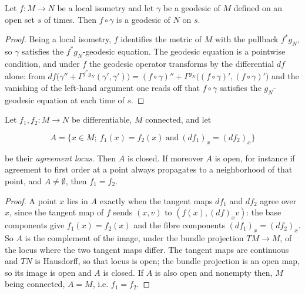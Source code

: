 \begin{lemma}
  \label{lem:dc-ch8-4-2-geodesic-push}
  \leanok
  Let $f:M\to N$ be a local isometry and let $\gamma$ be a geodesic of $M$ defined on
  an open set $s$ of times. Then $f\circ\gamma$ is a geodesic of $N$ on $s$.
\end{lemma}
\begin{proof}
  \leanok
\sketch
  Being a local isometry, $f$ identifies the metric of $M$ with the pullback $f^*g_N$,
  so $\gamma$ satisfies the $f^*g_N$-geodesic equation. The geodesic equation is a
  pointwise condition, and under $f$ the geodesic operator transforms by the
  differential $df$ alone: from $df\big(\gamma''+\Gamma^{f^*g_N}(\gamma',\gamma')\big)
  =(f\circ\gamma)''+\Gamma^{g_N}\big((f\circ\gamma)',(f\circ\gamma)'\big)$ and the
  vanishing of the left-hand argument one reads off that $f\circ\gamma$ satisfies the
  $g_N$-geodesic equation at each time of $s$.
\end{proof}

\begin{lemma}
  \label{lem:dc-ch8-4-2-agree-locus}
  \leanok
  Let $f_1,f_2:M\to N$ be differentiable, $M$ connected, and let

  $$
  A=\{x\in M;\ f_1(x)=f_2(x)\ \text{and}\ (df_1)_x=(df_2)_x\}
  $$

  be their \emph{agreement locus}. Then $A$ is closed. If moreover $A$ is open, for
  instance if agreement to first order at a point always propagates to a neighborhood
  of that point, and $A\neq\emptyset$, then $f_1=f_2$.
\end{lemma}
\begin{proof}
  \leanok
\sketch
  A point $x$ lies in $A$ exactly when the tangent maps $df_1$ and $df_2$ agree over
  $x$, since the tangent map of $f$ sends $(x,v)$ to $(f(x),(df)_x v)$: the base
  components give $f_1(x)=f_2(x)$ and the fibre components $(df_1)_x=(df_2)_x$. So $A$
  is the complement of the image, under the bundle projection $TM\to M$, of the locus
  where the two tangent maps differ. The tangent maps are continuous and $TN$ is
  Hausdorff, so that locus is open; the bundle projection is an open map, so its image
  is open and $A$ is closed. If $A$ is also open and nonempty then, $M$ being
  connected, $A=M$, i.e. $f_1=f_2$.
\end{proof}

